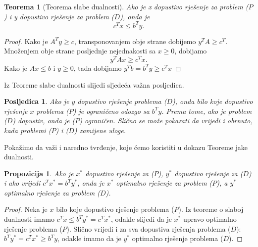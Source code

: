 \documentclass[b5paper, utf8, 11pt, colorlinks]{book}
\newtheorem{thm}{Teorema}[chapter]
\newtheorem{prop}{Propozicija}[chapter]
\newtheorem{poslje}{Posljedica}[chapter]
\theoremstyle{definition}
\begin{document}
\begin{thm}[Teorema slabe dualnosti]
	Ako je x dopustivo rješenje za problem ($P$) i y dopustivo rješenje za problem  ($D$), onda je 
	$$ c^T x \leq b^T y.$$
\end{thm}
\begin{proof}
	Kako je $A^T y \geq c $,  transponovanjem obje strane dobijemo 
	$y^T A \geq c^T$. Množenjem obje strane posljednje nejednakosti sa $x \geq 0$, dobijamo 
	$$y^TAx \geq c^T x.$$ Kako je $Ax \leq b$ i $y \geq 0$,  tada dobijamo 
	$ y^T b = b^T y  \geq c^T x$
\end{proof}
Iz Teoreme slabe dualnosti slijedi sljedeća važna posljedica.
\begin{poslje}
	Ako je $y$ dopustivo rješenje problema  ($D$),  onda bilo koje dopustivo rješenje $x$ problema ($P$) je ograničeno odozgo sa $b^T y$. Prema tome, ako je problem ($D$) dopustiv, onda je ($P$) ograničen. Slično se može pokazati da vrijedi i obrnuto,  kada problemi ($P$) i ($D$) zamijene uloge.
\end{poslje}

Pokažimo da važi i naredno tvrđenje, koje ćemo koristiti u dokazu Teoreme jake dualnosti.

\begin{prop}  
	Ako je $x^*$ dopustivo rješenje za  ($P$), $y^*$ dopustivo rješenje za ($D$) i ako vrijedi   	$c^T x^* = b^T y^*$, onda je $x^*$ optimalno rješenje za problem  ($P$), a $y^*$ optimalno rješenje za problem  ($D$).  
\end{prop}
\begin{proof}
	Neka je $x$ bilo koje dopustivo rješenje problema ($P$). Iz teoreme o slaboj dualnosti imamo $c^T x  \leq b^T y^* = c^T x^*$, odakle slijedi da je $x^*$ upravo optimalno rješenje problema  ($P$).
	Slično vrijedi i za sva dopustiva rješenja problema ($D$): $b^T y^* = c^T x^* \geq b^T y$, odakle imamo da je $y^*$ optimalno rješenje problema  ($D$). 
\end{proof}
\end{document}

